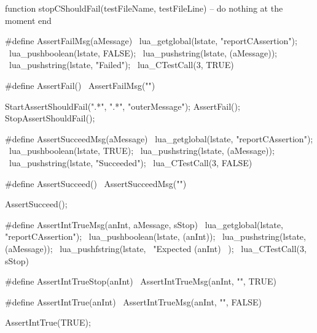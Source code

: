 function stopCShouldFail(testFileName, testFileLine)
  -- do nothing at the moment
end
\stopLuaCode

\stopTestSuite

\startTestSuite[assertFail]

\startCHeader
#define AssertFailMsg(aMessage)              \
  lua_getglobal(lstate, "reportCAssertion"); \
  lua_pushboolean(lstate, FALSE);            \
  lua_pushstring(lstate, (aMessage));        \
  lua_pushstring(lstate, "Failed");          \
  lua_CTestCall(3, TRUE)
  
#define AssertFail() \
  AssertFailMsg("")
\stopCHeader


\startCTest
  StartAssertShouldFail(".*", ".*", "outerMessage");
    AssertFail();
  StopAssertShouldFail();
\stopCTest

\stopTestCase

\stopTestSuite

\startTestSuite[assertSucceed]

\startCHeader
#define AssertSucceedMsg(aMessage)           \
  lua_getglobal(lstate, "reportCAssertion"); \
  lua_pushboolean(lstate, TRUE);             \
  lua_pushstring(lstate, (aMessage));        \
  lua_pushstring(lstate, "Succeeded");       \
  lua_CTestCall(3, FALSE)

#define AssertSucceed() \
  AssertSucceedMsg("")
\stopCHeader


\startCTest
  AssertSucceed();
\stopCTest
\stopTestCase

\stopTestSuite

\startTestSuite[assertIntTrue]

\startCHeader
#define AssertIntTrueMsg(anInt, aMessage, sStop) \
  lua_getglobal(lstate, "reportCAssertion");     \
  lua_pushboolean(lstate, (anInt));              \
  lua_pushstring(lstate, (aMessage));            \
  lua_pushfstring(lstate,                        \
      "Expected %
      (anInt)                                    \
    );                                           \
  lua_CTestCall(3, sStop)

#define AssertIntTrueStop(anInt)    \
  AssertIntTrueMsg(anInt, "", TRUE)

#define AssertIntTrue(anInt)         \
  AssertIntTrueMsg(anInt, "", FALSE)
\stopCHeader

\startTestCase[should succeed if true]
\startCTest
  AssertIntTrue(TRUE);
\stopCTest
\stopTestCase
\stopTestSuite

